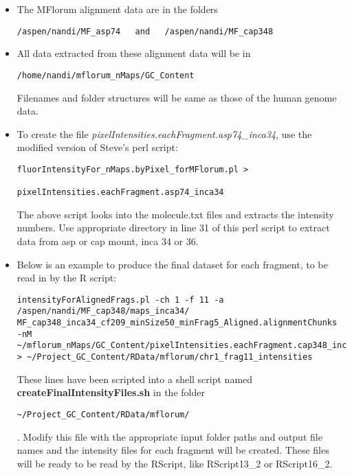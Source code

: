 \documentclass[11pt]{article}
\begin{document}
\begin{enumerate}
\begin{itemize}
\item
The MFlorum alignment data are in the folders
\begin{verbatim}
/aspen/nandi/MF_asp74   and   /aspen/nandi/MF_cap348
\end{verbatim}
\item
All data extracted from these alignment data will be in 
\begin{verbatim}
/home/nandi/mflorum_nMaps/GC_Content
\end{verbatim}
Filenames and folder structures will be same as those of the human genome data. 
\item
To create the file {\it{pixelIntensities.eachFragment.asp74\_inca34}}, use the modified version of Steve's perl script: 
\begin{verbatim}
fluorIntensityFor_nMaps.byPixel_forMFlorum.pl > 
                             pixelIntensities.eachFragment.asp74_inca34
\end{verbatim}
The above script looks into the molecule.txt files and extracts the intensity numbers.
Use appropriate directory in line 31 of this perl script to extract data from asp or cap mount, inca 34 or 36.
\item
Below is an example to produce the final dataset for each fragment, to be read in by the R script:
\begin{verbatim}
intensityForAlignedFrags.pl -ch 1 -f 11 -a 
/aspen/nandi/MF_cap348/maps_inca34/
MF_cap348_inca34_cf209_minSize50_minFrag5_Aligned.alignmentChunks 
-nM ~/mflorum_nMaps/GC_Content/pixelIntensities.eachFragment.cap348_inca34 
> ~/Project_GC_Content/RData/mflorum/chr1_frag11_intensities
\end{verbatim}
These lines have been scripted into a shell script named {\bf{createFinalIntensityFiles.sh}} in the folder 
\begin{verbatim} 
~/Project_GC_Content/RData/mflorum/ 
\end{verbatim}. 
Modify this file with the appropriate input folder paths and output file names and the intensity files for each fragment will be created. These files will be ready to be read by the RScript, like RScript13\_2 or RScript16\_2. 
\end{itemize}


\end{enumerate}
\end{document}
